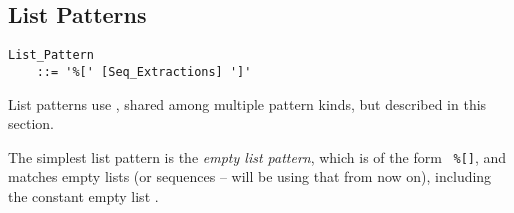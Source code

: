 \subsection{List Patterns}
\label{sec:list-patterns}

\grammar\begin{lstlisting}
List_Pattern 
    ::= '%[' [Seq_Extractions] ']'
\end{lstlisting}

List patterns use , shared among multiple pattern kinds, but described in this section. 

The simplest list pattern is the {\em empty list pattern}, which is of the form ~\lstinline!%[]!, and matches empty lists (or sequences -- will be using that from now on), including the constant empty list . 

